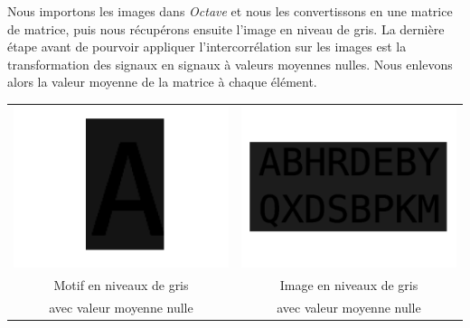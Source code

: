 \documentclass[a4paper,12pt,titlepage]{report}
\newcommand{\octave}{\textit{Octave }}
\begin{document}
		Nous importons les images dans \octave et nous les convertissons en une matrice de matrice, puis nous récupérons ensuite l'image en niveau de gris. La dernière étape avant de pourvoir appliquer l'intercorrélation sur les images est la transformation des signaux en signaux à valeurs moyennes nulles. Nous enlevons alors la valeur moyenne de la matrice à chaque élément.
		\begin{center}
		\begin{tabular}{cc}
				\includegraphics[scale=0.15]{../illus/motifm0.png} & \includegraphics[scale=0.4]{../illus/motm0.png}\\
				Motif en niveaux de gris  & Image en niveaux de gris \\
				avec valeur moyenne nulle & avec valeur moyenne nulle\\
		\end{tabular}	
		\end{center}
		
\end{document}
